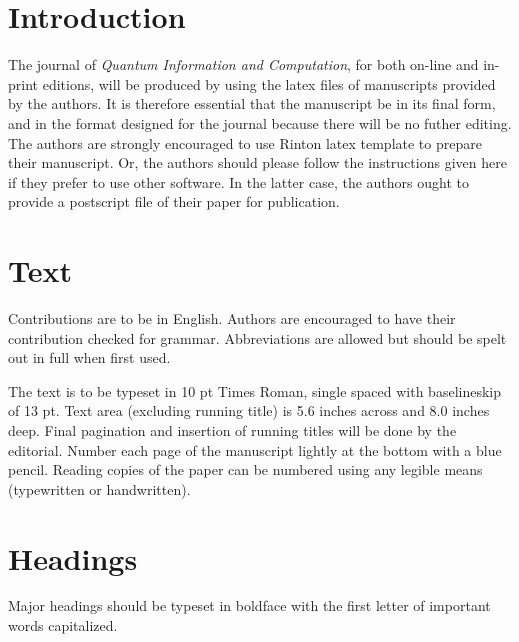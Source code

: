 \documentclass[twoside]{article}
\renewcommand{\thefootnote}{\fnsymbol{footnote}}  %
\begin{document}
\vspace*{3pt}

\vspace*{1pt}\textlineskip    %
\section{Introduction}        
The journal of {\it Quantum Information and Computation},
for both on-line and in-print editions,
will be produced by using the latex files of manuscripts
provided by the authors. It is therefore essential that the manuscript 
be in its final form, and in the format designed for the journal 
because there will be no futher editing. The authors are strongly encouraged 
to use Rinton latex template to prepare their manuscript. Or, the authors 
should please follow the instructions given here if they prefer to use other 
software. In the latter case, the authors ought to
provide a postscript file of their paper for publication.

\section{Text}
\noindent
Contributions are to be in English. Authors are encouraged to
have their contribution checked for grammar.  
Abbreviations are allowed but should be spelt
out in full when first used. 

\setcounter{footnote}{0}
\renewcommand{\thefootnote}{\alph{footnote}}

The text is to be typeset in 10 pt Times Roman, single spaced
with baselineskip of 13 pt. Text area (excluding running title)
is 5.6 inches across and 8.0 inches deep.
Final pagination and insertion of running titles will be done by
the editorial. Number each page of the manuscript lightly at the
bottom with a blue pencil. Reading copies of the paper can be
numbered using any legible means (typewritten or handwritten).

\section{Headings}
\noindent
Major headings should be typeset in boldface with the first
letter of important words capitalized.
\end{document}
